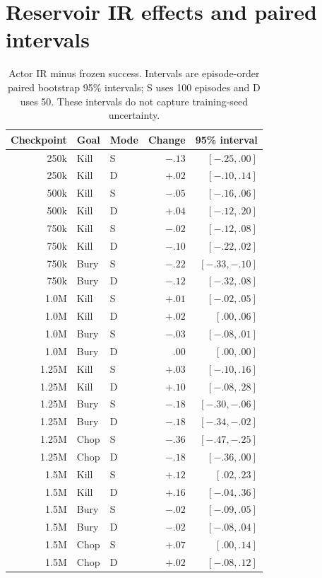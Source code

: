 \documentclass[10pt]{article}
\begin{document}
\section{Reservoir IR effects and paired intervals}

\begin{table}[H]
\centering
\small
\caption{Actor IR minus frozen success. Intervals are episode-order paired bootstrap 95\% intervals; S uses 100 episodes and D uses 50. These intervals do not capture training-seed uncertainty.}
\begin{tabular}{rllrr}
\toprule
Checkpoint & Goal & Mode & Change & 95\% interval \\
\midrule
250k & Kill & S & $-.13$ & $[-.25,.00]$ \\
250k & Kill & D & $+.02$ & $[-.10,.14]$ \\
500k & Kill & S & $-.05$ & $[-.16,.06]$ \\
500k & Kill & D & $+.04$ & $[-.12,.20]$ \\
750k & Kill & S & $-.02$ & $[-.12,.08]$ \\
750k & Kill & D & $-.10$ & $[-.22,.02]$ \\
750k & Bury & S & $-.22$ & $[-.33,-.10]$ \\
750k & Bury & D & $-.12$ & $[-.32,.08]$ \\
1.0M & Kill & S & $+.01$ & $[-.02,.05]$ \\
1.0M & Kill & D & $+.02$ & $[.00,.06]$ \\
1.0M & Bury & S & $-.03$ & $[-.08,.01]$ \\
1.0M & Bury & D & $.00$ & $[.00,.00]$ \\
1.25M & Kill & S & $+.03$ & $[-.10,.16]$ \\
1.25M & Kill & D & $+.10$ & $[-.08,.28]$ \\
1.25M & Bury & S & $-.18$ & $[-.30,-.06]$ \\
1.25M & Bury & D & $-.18$ & $[-.34,-.02]$ \\
1.25M & Chop & S & $-.36$ & $[-.47,-.25]$ \\
1.25M & Chop & D & $-.18$ & $[-.36,.00]$ \\
1.5M & Kill & S & $+.12$ & $[.02,.23]$ \\
1.5M & Kill & D & $+.16$ & $[-.04,.36]$ \\
1.5M & Bury & S & $-.02$ & $[-.09,.05]$ \\
1.5M & Bury & D & $-.02$ & $[-.08,.04]$ \\
1.5M & Chop & S & $+.07$ & $[.00,.14]$ \\
1.5M & Chop & D & $+.02$ & $[-.08,.12]$ \\
\bottomrule
\end{tabular}
\end{table}
\end{document}

